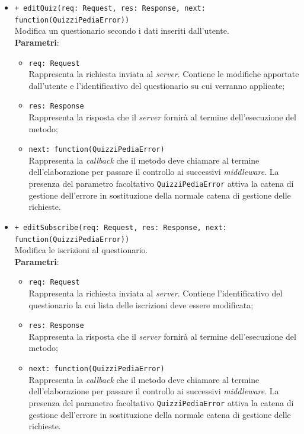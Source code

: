 \begin{itemize}
\begin{itemize}
	\item \texttt{+ editQuiz(req: Request, res: Response, next: function(QuizziPediaError))}\\
		Modifica un questionario secondo i dati inseriti dall'utente.\\
		\textbf{Parametri}:
		\begin{itemize}
			\item \texttt{req: Request}\\
			Rappresenta la richiesta inviata al \textit{server}. Contiene le modifiche apportate dall'utente e l'identificativo del questionario su cui verranno applicate;
			\item \texttt{res: Response}\\
			Rappresenta la risposta che il \textit{server} fornirà al termine dell'esecuzione del metodo;
			\item \texttt{next: function(QuizziPediaError)}\\
			Rappresenta la \textit{callback} che il metodo deve chiamare al termine dell'elaborazione per passare il controllo ai successivi \textit{middleware}. La presenza del parametro facoltativo \texttt{QuizziPediaError} attiva la catena di gestione dell'errore in sostituzione della normale catena di gestione delle richieste.
		\end{itemize}
		
		\item \texttt{+ editSubscribe(req: Request, res: Response, next: function(QuizziPediaError))}\\
		Modifica le iscrizioni al questionario.\\
		\textbf{Parametri}:
		\begin{itemize}
			\item \texttt{req: Request}\\
			Rappresenta la richiesta inviata al \textit{server}. Contiene l'identificativo del questionario la cui lista delle iscrizioni deve essere modificata;
			\item \texttt{res: Response}\\
			Rappresenta la risposta che il \textit{server} fornirà al termine dell'esecuzione del metodo;
			\item \texttt{next: function(QuizziPediaError)}\\
			Rappresenta la \textit{callback} che il metodo deve chiamare al termine dell'elaborazione per passare il controllo ai successivi \textit{middleware}. La presenza del parametro facoltativo \texttt{QuizziPediaError} attiva la catena di gestione dell'errore in sostituzione della normale catena di gestione delle richieste.
		\end{itemize}
		

\end{itemize}
\end{itemize}

